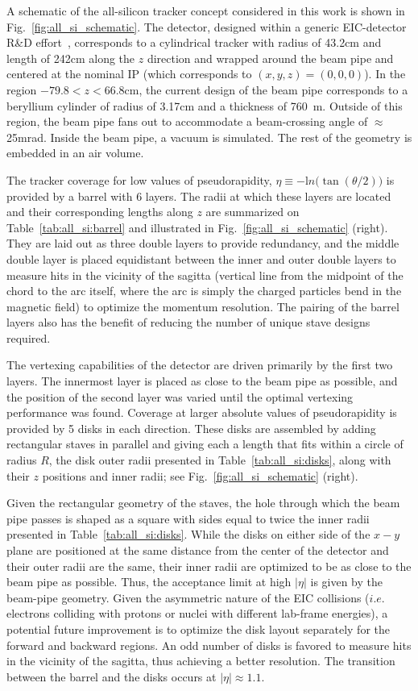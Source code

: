 A schematic of the all-silicon tracker concept considered in this work is shown in Fig.~\ref{fig:all_si_schematic}.
The detector, designed within a generic EIC-detector R\&D effort~\cite{eRD16},
corresponds to a cylindrical tracker with radius of 43.2cm and length of 242cm along the $z$ direction and wrapped around the beam pipe and centered at the nominal IP (which corresponds to $(x,y,z)=(0,0,0)$). In the region $-79.8 < z < 66.8$cm, the current design of the beam pipe corresponds to a beryllium cylinder of radius of 3.17cm and a thickness of 760~\textmu m. Outside of this region, the beam pipe fans out to accommodate a beam-crossing angle of $\approx$25mrad. Inside the beam pipe, a vacuum is simulated. The rest of the geometry is embedded in an air volume.

The tracker coverage for low values of pseudorapidity, $\eta\equiv-{\mathrm ln}\big(\tan(\theta/2)\big)$ is provided by a barrel with 6 layers. The radii at which these layers are located and their corresponding lengths along $z$ are summarized on Table~\ref{tab:all_si:barrel} and illustrated in Fig.~\ref{fig:all_si_schematic} (right). They are laid out as three double layers to provide redundancy, and the middle double layer is placed equidistant between the inner and outer double layers to measure hits in the vicinity of the sagitta (vertical line from the midpoint of the chord to the arc itself, where the arc is simply the charged particles bend in the magnetic field) to optimize the momentum resolution. The pairing of the barrel layers also has the benefit of reducing the number of unique stave designs required.

The vertexing capabilities of the detector are driven primarily by the
first two layers. The innermost layer is placed as close to the beam pipe as possible, and the position of the second layer was varied until the optimal vertexing performance was found. Coverage at larger absolute values of pseudorapidity is provided by 5 disks in each direction. These disks are assembled by adding rectangular staves in parallel and giving each a length that fits within a circle of radius $R$, the disk outer radii presented in Table~\ref{tab:all_si:disks}, along with their $z$ positions and inner radii; see Fig.~\ref{fig:all_si_schematic} (right).

Given the rectangular geometry of the staves, the hole through which the beam pipe passes is shaped as a square with sides equal to twice the inner radii presented in Table~\ref{tab:all_si:disks}.
While the disks on either side of the $x-y$ plane are positioned at the same distance from the center of the detector and their outer radii are the same, their inner radii are optimized to be as close to the beam pipe as possible. Thus, the acceptance limit at high $|\eta|$ is given by the beam-pipe geometry.
Given the asymmetric nature of the EIC collisions ($i.e.$ electrons colliding with protons or nuclei with different lab-frame energies), a potential future improvement is to optimize the disk layout separately for the forward and backward regions.
An odd number of disks is favored to measure hits in the vicinity of the sagitta, thus achieving a better resolution.
The transition between the barrel and the disks occurs at
$|\eta|\approx 1.1$.

